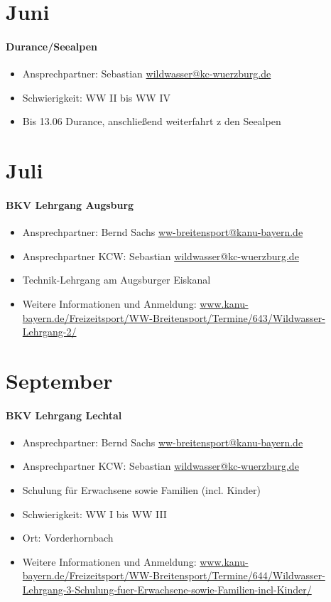\documentclass[12pt, a4paper]{report}
\begin{document}
\section*{Juni}\paragraph{Durance/Seealpen}
\begin{itemize}
    \item Ansprechpartner: Sebastian \href{mailto:wildwasser@kc-wuerzburg.de}{wildwasser@kc-wuerzburg.de}
    \item Schwierigkeit: WW II bis WW IV
    \item Bis 13.06 Durance, anschließend weiterfahrt z den Seealpen
\end{itemize}

\section*{Juli}\paragraph{BKV Lehrgang Augsburg}
\begin{itemize}
    \item Ansprechpartner: Bernd Sachs \href{mailto:ww-breitensport@kanu-bayern.de}{ww-breitensport@kanu-bayern.de}
    \item Ansprechpartner KCW: Sebastian \href{mailto:wildwasser@kc-wuerzburg.de}{wildwasser@kc-wuerzburg.de}
    \item Technik-Lehrgang am Augsburger Eiskanal
    \item Weitere Informationen und Anmeldung: \url{www.kanu-bayern.de/Freizeitsport/WW-Breitensport/Termine/643/Wildwasser-Lehrgang-2/}
\end{itemize}

\section*{September}\paragraph{BKV Lehrgang Lechtal}
\begin{itemize}
    \item Ansprechpartner: Bernd Sachs \href{mailto:ww-breitensport@kanu-bayern.de}{ww-breitensport@kanu-bayern.de}
    \item Ansprechpartner KCW: Sebastian \href{mailto:wildwasser@kc-wuerzburg.de}{wildwasser@kc-wuerzburg.de}
    \item Schulung für Erwachsene sowie Familien (incl. Kinder)
    \item Schwierigkeit: WW I bis WW III
    \item Ort: Vorderhornbach
    \item Weitere Informationen und Anmeldung: \url{www.kanu-bayern.de/Freizeitsport/WW-Breitensport/Termine/644/Wildwasser-Lehrgang-3-Schulung-fuer-Erwachsene-sowie-Familien-incl-Kinder/}
\end{itemize}
\end{document}
